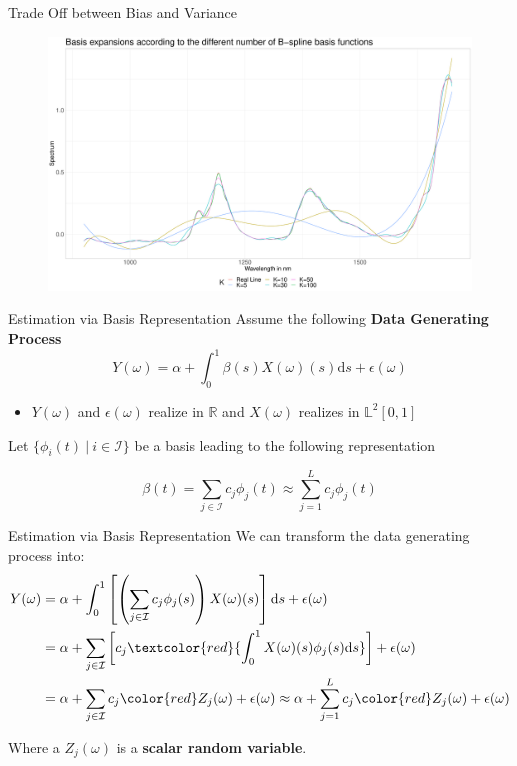 \documentclass{beamer}
\begin{document}
	\begin{frame}{Trade Off between Bias and Variance}
		\begin{figure}\notag
			\includegraphics[width =
			\textwidth]{../Graphics/basis_expansions.pdf}
		\end{figure}
	\end{frame}

	\begin{frame}{Estimation via Basis Representation}
		Assume the following \textbf{Data Generating Process}
		$$Y(\omega) = \alpha + \int_{0}^{1} \beta(s) X(\omega)(s) \mathrm{d}s + \epsilon(\omega)$$
		\vspace{-0.6cm}
		\begin{itemize}
			\item $Y(\omega)$ and $\epsilon(\omega)$ realize in $\mathbb{R}$ and $X(\omega)$ realizes in $\mathbb{L}^2[0,1]$
		\end{itemize}
		\vspace{0.7cm}
					
		Let $\{\phi_i(t) \: \vert \: i \in \mathcal{I}\}$ be a basis leading to the following representation
		
		$$\beta(t) = \sum_{j \in \mathcal{I}} c_j \phi_j(t) \approx \sum_{j = 1}^{L} c_j \phi_j(t)$$

	\end{frame}

	\begin{frame}{Estimation via Basis Representation}
		We can transform the data generating process into:
		\begin{equation}\notag
			\begin{split}
				Y(\omega) & = \alpha + \int_{0}^{1}\left[\left(\sum_{j \in \mathcal{I}} c_j  \phi_j(s)\right) X(\omega)(s) \right]\mathrm{d}s + \epsilon(\omega) \\
						  & = \alpha + \sum_{j \in \mathcal{I}} \left[c_j \textcolor{red}{\int_{0}^{1} X(\omega)(s) \phi_j(s)\mathrm{d}s}\right] + \epsilon(\omega)	 \\
						  & = \alpha + \sum_{j \in \mathcal{I}} c_j {\color{red}Z_j(\omega)} + \epsilon(\omega)  \approx  \alpha + \sum_{j = 1}^{L} c_j {\color{red}Z_j(\omega)}  + \epsilon(\omega)
			\end{split}
		\end{equation}
	
		Where a $Z_j(\omega)$ is a \textbf{scalar random variable}.
	\end{frame}
\end{document}
